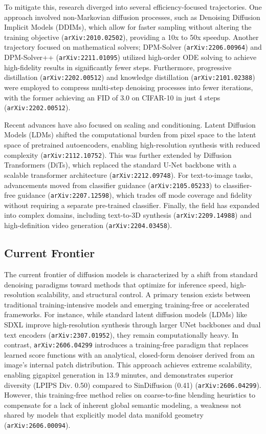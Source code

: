 \documentclass[11pt]{article}
\begin{document}
To mitigate this, research diverged into several efficiency-focused trajectories. One approach involved non-Markovian diffusion processes, such as Denoising Diffusion Implicit Models (DDIMs), which allow for faster sampling without altering the training objective (\texttt{arXiv:2010.02502}), providing a 10x to 50x speedup. Another trajectory focused on mathematical solvers; DPM-Solver (\texttt{arXiv:2206.00964}) and DPM-Solver++ (\texttt{arXiv:2211.01095}) utilized high-order ODE solving to achieve high-fidelity results in significantly fewer steps. Furthermore, progressive distillation (\texttt{arXiv:2202.00512}) and knowledge distillation (\texttt{arXiv:2101.02388}) were employed to compress multi-step denoising processes into fewer iterations, with the former achieving an FID of 3.0 on CIFAR-10 in just 4 steps (\texttt{arXiv:2202.00512}).

Recent advances have also focused on scaling and conditioning. Latent Diffusion Models (LDMs) shifted the computational burden from pixel space to the latent space of pretrained autoencoders, enabling high-resolution synthesis with reduced complexity (\texttt{arXiv:2112.10752}). This was further extended by Diffusion Transformers (DiTs), which replaced the standard U-Net backbone with a scalable transformer architecture (\texttt{arXiv:2212.09748}). For text-to-image tasks, advancements moved from classifier guidance (\texttt{arXiv:2105.05233}) to classifier-free guidance (\texttt{arXiv:2207.12598}), which trades off mode coverage and fidelity without requiring a separate pre-trained classifier. Finally, the field has expanded into complex domains, including text-to-3D synthesis (\texttt{arXiv:2209.14988}) and high-definition video generation (\texttt{arXiv:2204.03458}).

\subsection{Current Frontier}

The current frontier of diffusion models is characterized by a shift from standard denoising paradigms toward methods that optimize for inference speed, high-resolution scalability, and structural control. A primary tension exists between traditional training-intensive models and emerging training-free or accelerated frameworks. For instance, while standard latent diffusion models (LDMs) like SDXL improve high-resolution synthesis through larger UNet backbones and dual text encoders (\texttt{arXiv:2307.01952}), they remain computationally heavy. In contrast, \texttt{arXiv:2606.04299} introduces a training-free paradigm that replaces learned score functions with an analytical, closed-form denoiser derived from an image's internal patch distribution. This approach achieves extreme scalability, enabling gigapixel generation in 13.9 minutes, and demonstrates superior diversity (LPIPS Div. 0.50) compared to SinDiffusion (0.41) (\texttt{arXiv:2606.04299}). However, this training-free method relies on coarse-to-fine blending heuristics to compensate for a lack of inherent global semantic modeling, a weakness not shared by models that explicitly model data manifold geometry (\texttt{arXiv:2606.00094}).
\end{document}
